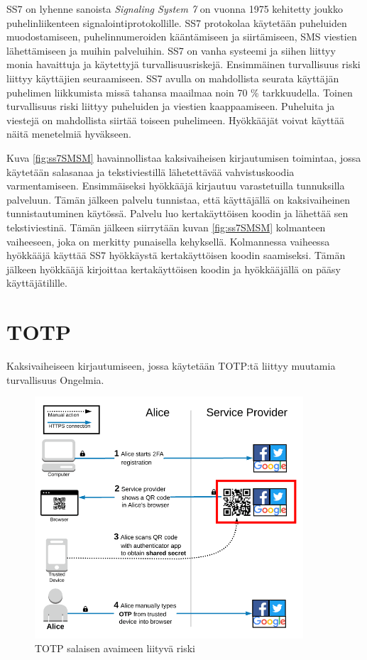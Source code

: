 SS7 on lyhenne sanoista \emph{Signaling System 7} on vuonna 1975 kehitetty joukko puhelinliikenteen signalointiprotokollille. SS7 protokolaa käytetään puheluiden muodostamiseen, puhelinnumeroiden kääntämiseen ja siirtämiseen, SMS viestien lähettämiseen ja muihin palveluihin. SS7 on vanha systeemi ja siihen liittyy monia havaittuja ja käytettyjä turvallisuusriskejä. Ensimmäinen turvallisuus riski liittyy käyttäjien seuraamiseen. SS7 avulla on mahdollista seurata käyttäjän puhelimen liikkumista missä tahansa maailmaa noin 70 \% tarkkuudella. Toinen turvallisuus riski liittyy puheluiden ja viestien kaappaamiseen. Puheluita ja viestejä on mahdollista siirtää toiseen puhelimeen. Hyökkääjät voivat käyttää näitä menetelmiä hyväkseen. \citep{ss7}

Kuva \ref{fig:ss7SMSM} havainnollistaa kaksivaiheisen kirjautumisen toimintaa, jossa käytetään salasanaa ja tekstiviestillä lähetettävää vahvistuskoodia varmentamiseen. Ensimmäiseksi hyökkääjä kirjautuu varastetuilla tunnuksilla palveluun. Tämän jälkeen palvelu tunnistaa, että käyttäjällä on kaksivaiheinen tunnistautuminen käytössä. Palvelu luo kertakäyttöisen koodin ja lähettää sen tekstiviestinä. Tämän jälkeen siirrytään kuvan \ref{fig:ss7SMSM}  kolmanteen vaiheeseen, joka on merkitty punaisella kehyksellä. Kolmannessa vaiheessa hyökkääjä käyttää SS7 hyökkäystä kertakäyttöisen koodin saamiseksi. Tämän jälkeen hyökkääjä kirjoittaa kertakäyttöisen koodin ja hyökkääjällä on pääsy käyttäjätilille.


\section{TOTP}

Kaksivaiheiseen kirjautumiseen, jossa käytetään TOTP:tä liittyy muutamia turvallisuus Ongelmia.

\begin{figure}[ht]
    \centering
    \includegraphics[width=10cm]{template/figures/TOTP service-provider-compromise.png}
    \caption{TOTP salaisen avaimeen liityvä riski \citep{TOTP}}
    \label{fig:TOTP_service_provider}
\end{figure}


